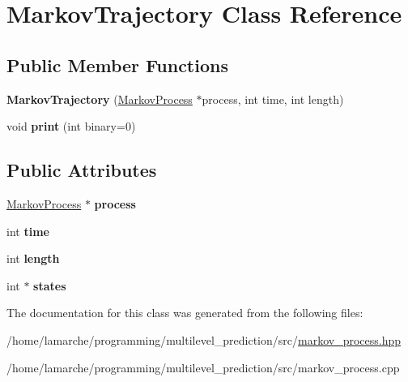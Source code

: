 \hypertarget{class_markov_trajectory}{\section{Markov\-Trajectory Class Reference}
\label{class_markov_trajectory}
}
\subsection*{Public Member Functions}
\begin{DoxyCompactItemize}
\item 
\hypertarget{class_markov_trajectory_a87acf0aef9d85e369378d004e06c56de}{{\bfseries Markov\-Trajectory} (\hyperlink{class_markov_process}{Markov\-Process} $\ast$process, int time, int length)}\label{class_markov_trajectory_a87acf0aef9d85e369378d004e06c56de}

\item 
\hypertarget{class_markov_trajectory_a29bb2d19771e93e6c87204c8ac2b3bd1}{void {\bfseries print} (int binary=0)}\label{class_markov_trajectory_a29bb2d19771e93e6c87204c8ac2b3bd1}

\end{DoxyCompactItemize}
\subsection*{Public Attributes}
\begin{DoxyCompactItemize}
\item 
\hypertarget{class_markov_trajectory_ada9138be4456a51a6f86c491079b0a58}{\hyperlink{class_markov_process}{Markov\-Process} $\ast$ {\bfseries process}}\label{class_markov_trajectory_ada9138be4456a51a6f86c491079b0a58}

\item 
\hypertarget{class_markov_trajectory_ab9a7f6133864c100caee694f7fb5c272}{int {\bfseries time}}\label{class_markov_trajectory_ab9a7f6133864c100caee694f7fb5c272}

\item 
\hypertarget{class_markov_trajectory_a12f640932269482c40e2a8efb9ff61c1}{int {\bfseries length}}\label{class_markov_trajectory_a12f640932269482c40e2a8efb9ff61c1}

\item 
\hypertarget{class_markov_trajectory_af7aa190f73505e8eb514ca7725572268}{int $\ast$ {\bfseries states}}\label{class_markov_trajectory_af7aa190f73505e8eb514ca7725572268}

\end{DoxyCompactItemize}


The documentation for this class was generated from the following files\-:\begin{DoxyCompactItemize}
\item 
/home/lamarche/programming/multilevel\-\_\-prediction/src/\hyperlink{markov__process_8hpp}{markov\-\_\-process.\-hpp}\item 
/home/lamarche/programming/multilevel\-\_\-prediction/src/markov\-\_\-process.\-cpp\end{DoxyCompactItemize}
